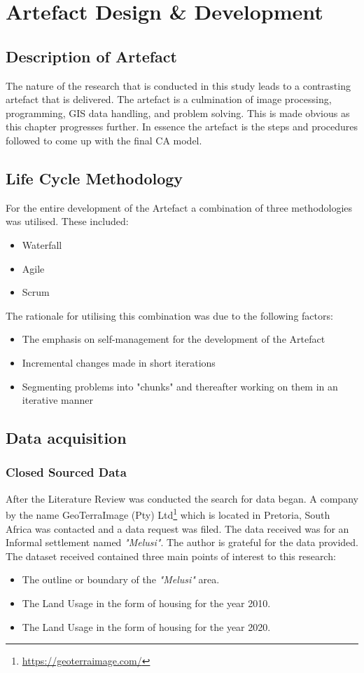 
\chapter{Artefact Design \& Development} %
\label{Chapter3} %
\section{Description of Artefact}
The nature of the research that is conducted in this study leads to a contrasting artefact that is delivered. The artefact is a culmination of image processing, programming, GIS data handling, and problem solving. This is made obvious as this chapter progresses further. In essence the artefact is the steps and procedures followed to come up with the final CA model.
\section{Life Cycle Methodology}
For the entire development of the Artefact a combination of three methodologies was utilised. These included:
\begin{itemize}
\item Waterfall
\item Agile
\item Scrum
\end{itemize}
The rationale for utilising this combination was due to the following factors:
\begin{itemize}
\item The emphasis on self-management for the development of the Artefact
\item Incremental changes made in short iterations
\item Segmenting problems into "chunks" and thereafter working on them in an iterative manner
\end{itemize}
\section{Data acquisition}
\subsection{Closed Sourced Data}
After the Literature Review was conducted the search for data began. A company by the name GeoTerraImage (Pty) Ltd\footnote{\url{https://geoterraimage.com/}} which is located in Pretoria, South Africa was contacted and a data request was filed. The data received was for an Informal settlement named \textit{"Melusi"}. The author is grateful for the data provided. The dataset received contained three main points of interest to this research:
\begin{itemize}
\item The outline or boundary of the \textit{"Melusi"} area.
\item The Land Usage in the form of housing for the year 2010.
\item The Land Usage in the form of housing for the year 2020.
\end{itemize}
